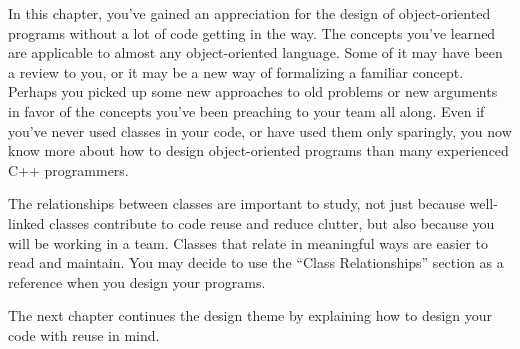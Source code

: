 In this chapter, you’ve gained an appreciation for the design of object-oriented programs without a lot of code getting in the way. The concepts you’ve learned are applicable to almost any object-oriented language. Some of it may have been a review to you, or it may be a new way of formalizing a familiar concept. Perhaps you picked up some new approaches to old problems or new arguments in favor of the concepts you’ve been preaching to your team all along. Even if you’ve never used classes in your code, or have used them only sparingly, you now know more about how to design object-oriented programs than many experienced C++ programmers.

The relationships between classes are important to study, not just because well-linked classes contribute to code reuse and reduce clutter, but also because you will be working in a team. Classes that relate in meaningful ways are easier to read and maintain. You may decide to use the “Class Relationships” section as a reference when you design your programs.

The next chapter continues the design theme by explaining how to design your code with reuse in mind.